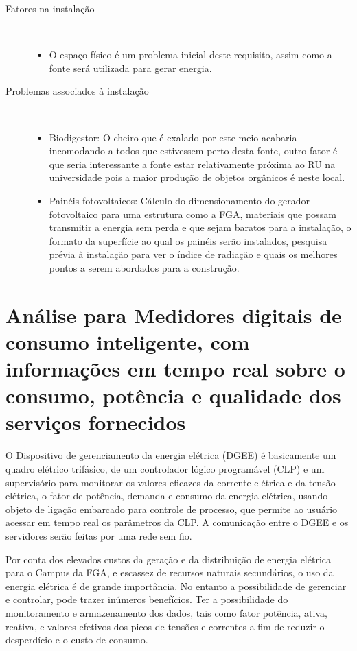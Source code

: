 \begin{description}
	\item [Fatores na instalação] \

	\begin{itemize}
	\item O espaço físico é um problema inicial deste requisito, assim como a fonte será utilizada para gerar energia.
	\end{itemize}
	\item[Problemas associados à instalação]\
	\begin{itemize}
	\item Biodigestor: O cheiro que é exalado por este meio acabaria incomodando a todos que estivessem perto desta fonte, outro fator é que seria interessante a fonte estar relativamente próxima ao RU na universidade pois a maior produção de objetos orgânicos é neste local.
	\item Painéis fotovoltaicos: Cálculo do dimensionamento do gerador fotovoltaico para uma estrutura como a FGA, materiais que possam transmitir a energia sem perda e que sejam baratos para a instalação, o formato da superfície ao qual os painéis serão instalados, pesquisa prévia à instalação para ver o índice de radiação e quais os melhores pontos a serem abordados para a construção.
	\end{itemize}
\end{description}

\section{Análise para Medidores digitais de consumo inteligente, com informações em tempo real sobre o consumo, potência e qualidade dos serviços fornecidos}
O Dispositivo de gerenciamento da energia elétrica (DGEE) é basicamente um quadro elétrico trifásico, de um controlador lógico programável (CLP) e um supervisório para monitorar os valores eficazes da corrente elétrica e da tensão elétrica, o fator de potência, demanda e consumo da energia elétrica, usando objeto de ligação embarcado para controle de processo, que permite ao usuário acessar em tempo real os parâmetros da CLP. A comunicação entre o DGEE e os servidores serão feitas por uma rede sem fio.

Por conta dos elevados custos da geração e da distribuição de energia elétrica para o Campus da FGA, e escassez de recursos naturais secundários, o uso da energia elétrica é de grande importância. No entanto a possibilidade de gerenciar e controlar, pode trazer inúmeros benefícios. Ter a possibilidade do monitoramento e armazenamento dos dados, tais como fator potência, ativa, reativa, e valores efetivos dos picos de tensões e correntes a fim de reduzir o desperdício e o custo de consumo. 
 
